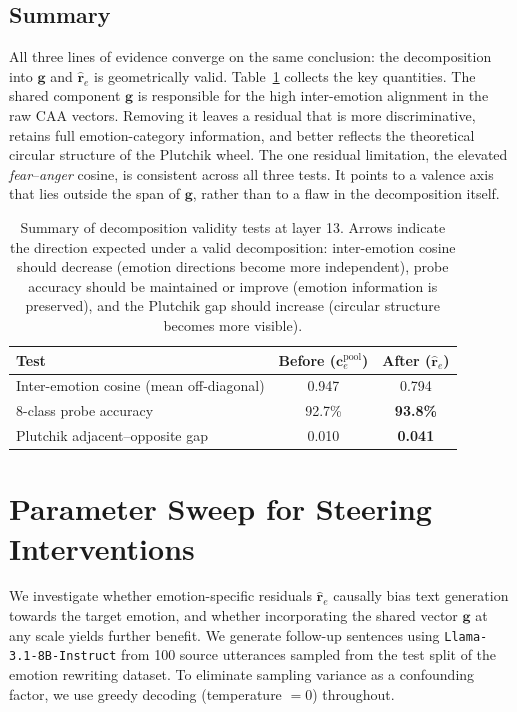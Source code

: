\subsection{Summary}

All three lines of evidence converge on the same conclusion: the decomposition into $\mathbf{g}$ and $\hat{\mathbf{r}}_e$ is geometrically valid. Table~\ref{tab:decomposition_validity_summary} collects the key quantities. The shared component $\mathbf{g}$ is responsible for the high inter-emotion alignment in the raw CAA vectors. Removing it leaves a residual that is more discriminative, retains full emotion-category information, and better reflects the theoretical circular structure of the Plutchik wheel. The one residual limitation, the elevated \textit{fear}--\textit{anger} cosine, is consistent across all three tests. It points to a valence axis that lies outside the span of $\mathbf{g}$, rather than to a flaw in the decomposition itself.\par

\begin{table}[H]
\centering
\small
\begin{tabular}{lcc}
\toprule
\textbf{Test} & \textbf{Before ($\mathbf{c}^{\mathrm{pool}}_e$)} & \textbf{After ($\hat{\mathbf{r}}_e$)} \\
\midrule
Inter-emotion cosine (mean off-diagonal) & 0.947 & 0.794 \\
8-class probe accuracy                   & 92.7\% & \textbf{93.8\%} \\
Plutchik adjacent--opposite gap          & 0.010 & \textbf{0.041} \\
\bottomrule
\end{tabular}
\caption{Summary of decomposition validity tests at layer 13. Arrows indicate the direction expected under a valid decomposition: inter-emotion cosine should decrease (emotion directions become more independent), probe accuracy should be maintained or improve (emotion information is preserved), and the Plutchik gap should increase (circular structure becomes more visible).}
\label{tab:decomposition_validity_summary}
\end{table}

\section{Parameter Sweep for Steering Interventions}
\label{sec:steering_experiments}

We investigate whether emotion-specific residuals $\hat{\mathbf{r}}_e$ causally bias text generation towards the target emotion, and whether incorporating the shared vector $\mathbf{g}$ at any scale yields further benefit. We generate follow-up sentences using \texttt{Llama-3.1-8B-Instruct} from 100 source utterances sampled from the test split of the emotion rewriting dataset. To eliminate sampling variance as a confounding factor, we use greedy decoding (temperature $= 0$) throughout.

